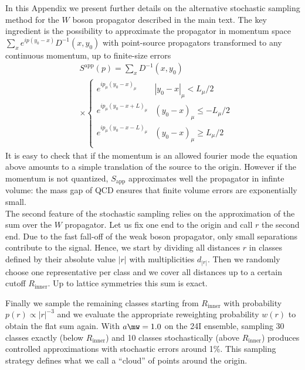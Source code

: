 \documentclass[aps,prd,twocolumn,nofootinbib,showpacs,superscriptaddress]{revtex4-1}
\begin{document}
In this Appendix we present further details on the alternative 
stochastic sampling method for the $W$ boson propagator described in the main text.
The key ingredient is the possibility to approximate the propagator in momentum
space 
$\sum_x e^{ip(y_0-x)} D^{-1}(x,y_0)$
with point-source propagators transformed to any
continuous momentum, up to finite-size errors
\begin{equation}
\begin{split}
& S^\mathrm{app} (p) = \sum_x D^{-1}(x,y_0) \\ 
& \times \left \lbrace 
\begin{array}{ll}
e^{ip_\mu (y_0-x)_\mu} & |y_0-x|_\mu<L_\mu/2 \\
e^{ip_\mu (y_0-x + L)_\mu} & (y_0-x)_\mu \leq -L_\mu/2 \\
e^{ip_\mu (y_0-x - L)_\mu} & (y_0-x)_\mu \geq L_\mu/2  \\
\end{array} \right.
\end{split}
\end{equation}
It is easy to check that if the momentum is an allowed fourier mode
the equation above amounts to a simple translation of the source to the origin. 
However if the momentum is not quantized,
$S_\mathrm{app}$ approximates well the propagator in infinte volume:
the mass gap of QCD ensures that finite volume errors are exponentially
small.\\

The second feature of the stochastic sampling relies on the approximation
of the sum over the $W$ propagator. Let us fix one end to the origin
and call $r$ the second end.
Due to the fast fall-off of the weak boson
propagator, only small separations 
contribute to the signal. Hence, we start by dividing all distances $r$
in classes defined by their absolute value $|r|$ with multiplicities 
$d_{|r|}$. Then we randomly
choose one representative per class and we cover all distances 
up to a certain cutoff $R_\mathrm{inner}$. Up to lattice symmetries
this sum is exact.

Finally we sample the remaining classes
starting from $R_\mathrm{inner}$ with probability
$p(r) \propto |r|^{-3}$ and we evaluate the appropriate reweighting 
probability $w(r)$ to obtain the flat sum again.
With $a \mw=1.0$ on the 24I ensemble, sampling 30 classes
exactly (below $R_\mathrm{inner}$) and 10 classes stochastically 
(above $R_\mathrm{inner}$) produces controlled approximations
 with stochastic errors around 1\%.
This sampling strategy defines what we call a ``cloud'' of points around the
origin.
\end{document}

